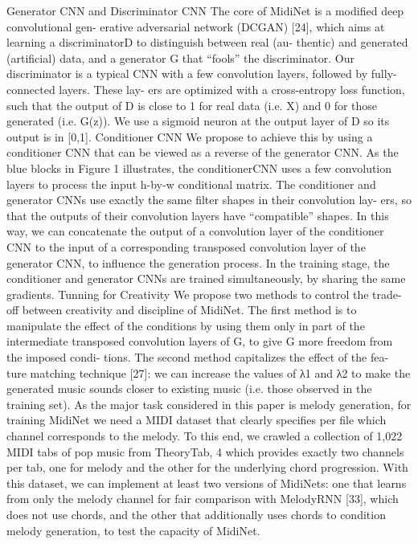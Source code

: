 Generator CNN and Discriminator CNN
The core of MidiNet is a modified deep convolutional gen- erative adversarial network (DCGAN) [24], which aims at learning a discriminatorD to distinguish between real (au- thentic) and generated (artificial) data, and a generator G that “fools” the discriminator. Our discriminator is a typical CNN with a few convolution layers, followed by fully-connected layers. These lay- ers are optimized with a cross-entropy loss function, such that the output of D is close to 1 for real data (i.e. X) and 0 for those generated (i.e. G(z)). We use a sigmoid neuron at the output layer of D so its output is in [0,1].
Conditioner CNN
We propose to achieve this by using a conditioner CNN
that can be viewed as a reverse of the generator CNN. As the blue blocks in Figure 1 illustrates, the conditionerCNN uses a few convolution layers to process the input h-by-w conditional matrix. The conditioner and generator CNNs use exactly the same filter shapes in their convolution lay- ers, so that the outputs of their convolution layers have “compatible” shapes. In this way, we can concatenate the output of a convolution layer of the conditioner CNN to the input of a corresponding transposed convolution layer of the generator CNN, to influence the generation process. In the training stage, the conditioner and generator CNNs are trained simultaneously, by sharing the same gradients.
Tunning for Creativity
We propose two methods to control the trade-off between creativity and discipline of MidiNet. The first method is to manipulate the effect of the conditions by using them only in part of the intermediate transposed convolution layers of G, to give G more freedom from the imposed condi- tions. The second method capitalizes the effect of the fea- ture matching technique [27]: we can increase the values of λ1 and λ2 to make the generated music sounds closer to existing music (i.e. those observed in the training set).
As the major task considered in this paper is melody generation, for training MidiNet we need a MIDI dataset that clearly specifies per file which channel corresponds to the melody. To this end, we crawled a collection of 1,022 MIDI tabs of pop music from TheoryTab, 4 which provides exactly two channels per tab, one for melody and the other for the underlying chord progression. With this dataset, we can implement at least two versions of MidiNets: one that learns from only the melody channel for fair comparison with MelodyRNN [33], which does not use chords, and the other that additionally uses chords to condition melody generation, to test the capacity of MidiNet.
